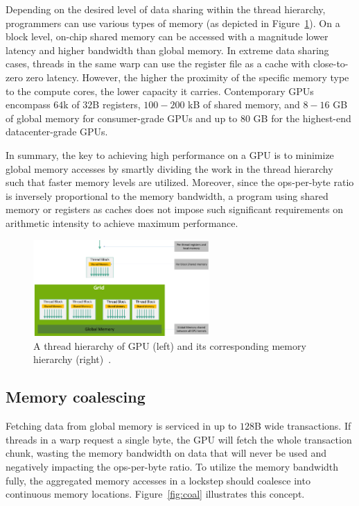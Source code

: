 Depending on the desired level of data sharing within the thread hierarchy, programmers can use various types of memory (as depicted in Figure~\ref{fig:mem-hierarchy}). On a block level, on-chip shared memory can be accessed with a magnitude lower latency and higher bandwidth than global memory. In extreme data sharing cases, threads in the same warp can use the register file as a cache with close-to-zero zero latency. However, the higher the proximity of the specific memory type to the compute cores, the lower capacity it carries. Contemporary GPUs encompass $64$k of $32$B registers, $100-200$ kB of shared memory, and $8-16$ GB of global memory for consumer-grade GPUs and up to $80$ GB for the highest-end datacenter-grade GPUs.

In summary, the key to achieving high performance on a GPU is to minimize global memory accesses by smartly dividing the work in the thread hierarchy such that faster memory levels are utilized. Moreover, since the ops-per-byte ratio is inversely proportional to the memory bandwidth, a program using shared memory or registers as caches does not impose such significant requirements on arithmetic intensity to achieve maximum performance.

\begin{figure}
    \centering
    \includegraphics[width=0.6\textwidth]{img/mem-hierarchy-2.png}
    \caption{A thread hierarchy of GPU (left) and its corresponding memory hierarchy (right)~\cite{site:cuda}.}
    \label{fig:mem-hierarchy}
\end{figure}

\subsection{Memory coalescing}
\label{sec:coalescing}

Fetching data from global memory is serviced in up to $128$B wide transactions. If threads in a warp request a single byte, the GPU will fetch the whole transaction chunk, wasting the memory bandwidth on data that will never be used and negatively impacting the ops-per-byte ratio. To utilize the memory bandwidth fully, the aggregated memory accesses in a lockstep should coalesce into continuous memory locations. Figure~\ref{fig:coal} illustrates this concept.

